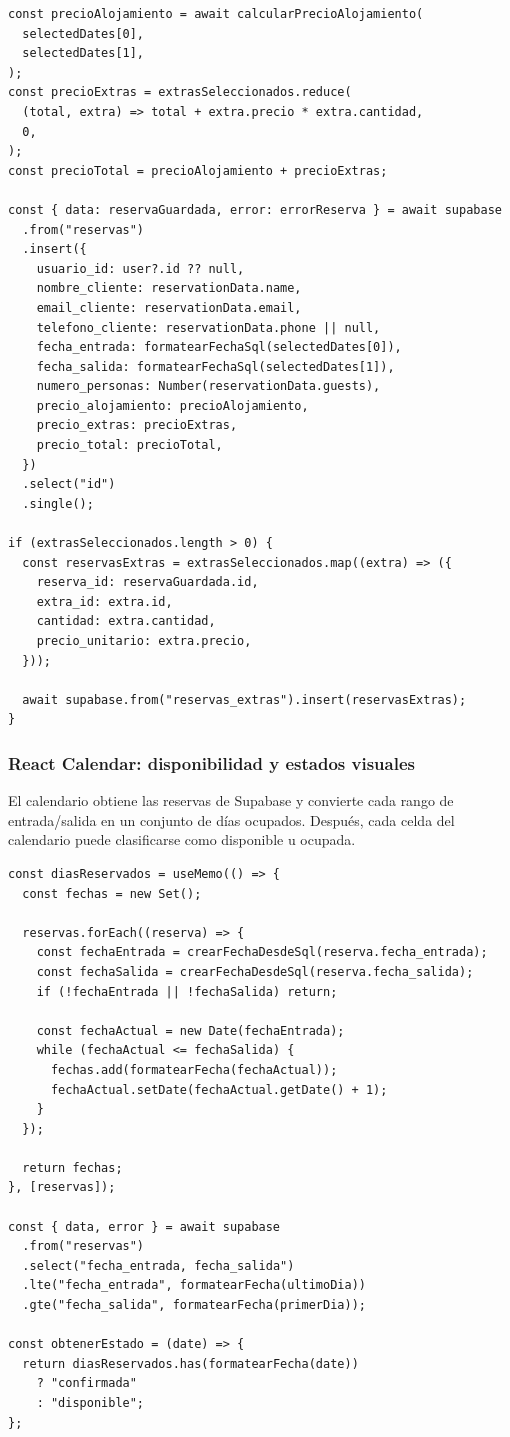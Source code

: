 \documentclass[11pt,a4paper]{article}
\begin{document}
\begin{verbatim}
const precioAlojamiento = await calcularPrecioAlojamiento(
  selectedDates[0],
  selectedDates[1],
);
const precioExtras = extrasSeleccionados.reduce(
  (total, extra) => total + extra.precio * extra.cantidad,
  0,
);
const precioTotal = precioAlojamiento + precioExtras;

const { data: reservaGuardada, error: errorReserva } = await supabase
  .from("reservas")
  .insert({
    usuario_id: user?.id ?? null,
    nombre_cliente: reservationData.name,
    email_cliente: reservationData.email,
    telefono_cliente: reservationData.phone || null,
    fecha_entrada: formatearFechaSql(selectedDates[0]),
    fecha_salida: formatearFechaSql(selectedDates[1]),
    numero_personas: Number(reservationData.guests),
    precio_alojamiento: precioAlojamiento,
    precio_extras: precioExtras,
    precio_total: precioTotal,
  })
  .select("id")
  .single();

if (extrasSeleccionados.length > 0) {
  const reservasExtras = extrasSeleccionados.map((extra) => ({
    reserva_id: reservaGuardada.id,
    extra_id: extra.id,
    cantidad: extra.cantidad,
    precio_unitario: extra.precio,
  }));

  await supabase.from("reservas_extras").insert(reservasExtras);
}
\end{verbatim}

\subsubsection{React Calendar: disponibilidad y estados visuales}
El calendario obtiene las reservas de Supabase y convierte cada rango de entrada/salida en un conjunto de días ocupados. Después, cada celda del calendario puede clasificarse como disponible u ocupada.

\begin{verbatim}
const diasReservados = useMemo(() => {
  const fechas = new Set();

  reservas.forEach((reserva) => {
    const fechaEntrada = crearFechaDesdeSql(reserva.fecha_entrada);
    const fechaSalida = crearFechaDesdeSql(reserva.fecha_salida);
    if (!fechaEntrada || !fechaSalida) return;

    const fechaActual = new Date(fechaEntrada);
    while (fechaActual <= fechaSalida) {
      fechas.add(formatearFecha(fechaActual));
      fechaActual.setDate(fechaActual.getDate() + 1);
    }
  });

  return fechas;
}, [reservas]);

const { data, error } = await supabase
  .from("reservas")
  .select("fecha_entrada, fecha_salida")
  .lte("fecha_entrada", formatearFecha(ultimoDia))
  .gte("fecha_salida", formatearFecha(primerDia));

const obtenerEstado = (date) => {
  return diasReservados.has(formatearFecha(date))
    ? "confirmada"
    : "disponible";
};
\end{verbatim}
\end{document}
